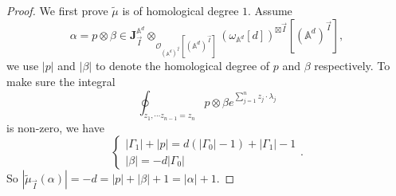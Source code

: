 \documentclass[11pt]{amsart}
\theoremstyle{definition}
\theoremstyle{remark}
\numberwithin{equation}{section}
\begin{document}
\begin{proof}
    We first prove $\tilde{\mu}$ is of homological degree $1$. Assume
    $$
    \alpha=p\otimes\beta\in\mathbf{J}_{\vec{I}}^{\mathbb{A}^{d}}\otimes_{\mathcal{O}_{(\mathbb{A}^{d})^{\vec{I}}}[(\mathbb{A}^{d})^{\vec{I}}]}(\omega_{\mathbb{A}^{d}}[d])^{\boxtimes\vec{I}}[(\mathbb{A}^{d})^{\vec{I}}],
    $$
    we use $|p|$ and $|\beta|$ to denote the homological degree of $p$ and $\beta$ respectively. To make sure the integral
    $$
    \oint_{z_{1},\cdots z_{n-1}=z_{n}}p\otimes\beta e^{\sum_{j=1}^{n}z_{j}\cdot \lambda_{j}}
    $$
    is non-zero, we have
    $$
    \begin{cases}
        |\Gamma_{1}|+|p|=d(|\Gamma_{0}|-1)+|\Gamma_{1}|-1\\
        |\beta|=-d|\Gamma_{0}|
    \end{cases}.
    $$
    So $|\tilde{\mu}_{\vec{I}}(\alpha)|=-d=|p|+|\beta|+1=|\alpha|+1$.


\end{proof}
\end{document}
